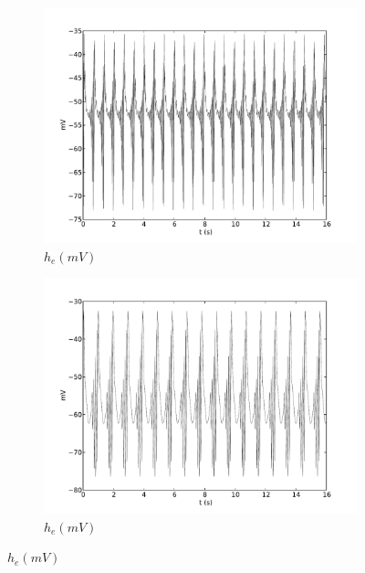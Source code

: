 \documentclass[a4paper,12pt]{article}
\begin{document}
\begin{figure}
\begin{subfigure}[b]{0.5\textwidth}
		\includegraphics[scale=0.35]{frontiers-2012-images-revised/effect_gamma_ee_yml-00493_ode-burst-psp-res_yml-mod-res-0_9-1-1-1_yml-he-intra.pdf}
		\caption{$h_e (mV)$}
	\end{subfigure}
	\begin{subfigure}[b]{0.5\textwidth}
		\includegraphics[scale=0.35]{frontiers-2012-images-revised/effect_gamma_ee_yml-00493_ode-burst-psp-res_yml-mod-res-0_5-1-1-1_yml-he-intra.pdf}
		\caption{$h_e (mV)$}
	\end{subfigure}


\end{figure}
\end{document}

